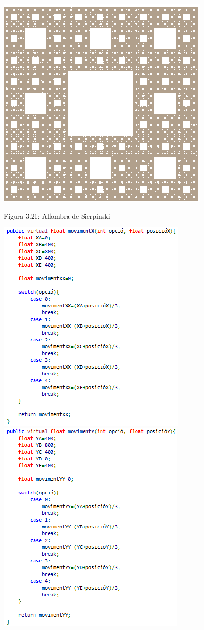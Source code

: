 \documentclass[12pt]{report}
\begin{document}
\begin{itemize}
\begin{figure}
\begin{list}{}
    \end{list}
       \hspace{12em} \includegraphics[width=0.4 \textwidth]{Alfombra.PNG}
        \begin{list}{}
        \item \hspace{10em} {Figura 3.21: Alfombra de Sierpinski} 
    \end{list}
    \end{figure}
    \newpage
    \begin{figure}
       \includegraphics[width=0.53 \textwidth]{MovimentXBoxI.PNG}
        \includegraphics[width=0.53 \textwidth]{MovimentYBoxI.PNG}

\end{figure}
\end{itemize}
\end{document}
